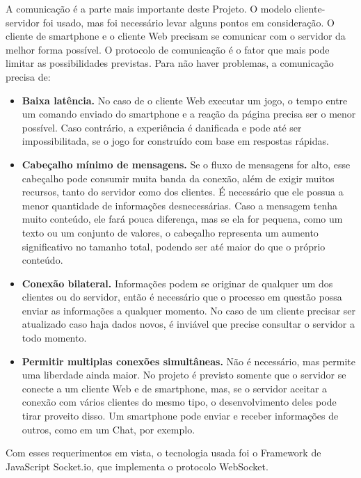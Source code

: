 \documentclass[a4paper,12pt]{article}
\begin{document}
A comunicação é a parte mais importante deste Projeto. O modelo cliente-servidor foi usado, mas foi necessário levar alguns pontos em consideração. O cliente de smartphone e o cliente Web precisam se comunicar com o servidor da melhor forma possível. O protocolo de comunicação é o fator que mais pode limitar as possibilidades previstas. Para não haver problemas, a comunicação precisa de:
\begin{itemize}

    \item \textbf{Baixa latência.} No caso de o cliente Web executar um jogo, o tempo entre um comando enviado do smartphone e a reação da página precisa ser o menor possível. Caso contrário, a experiência é danificada e pode até ser impossibilitada, se o jogo for construído com base em respostas rápidas.

    \item \textbf{Cabeçalho mínimo de mensagens.} Se o fluxo de mensagens for alto, esse cabeçalho pode consumir muita banda da conexão, além de exigir muitos recursos, tanto do servidor como dos clientes. É necessário que ele possua a menor quantidade de informações desnecessárias. Caso a mensagem tenha muito conteúdo, ele fará pouca diferença, mas se ela for pequena, como um texto ou um conjunto de valores, o cabeçalho representa um aumento significativo no tamanho total, podendo ser até maior do que o próprio conteúdo.

    \item \textbf{Conexão bilateral.} Informações podem se originar de qualquer um dos clientes ou do servidor, então é necessário que o processo em questão possa enviar as informações a qualquer momento. No caso de um cliente precisar ser atualizado caso haja dados novos, é inviável que precise consultar o servidor a todo momento.

    \item \textbf{Permitir multiplas conexões simultâneas.} Não é necessário, mas permite uma liberdade ainda maior. No projeto é previsto somente que o servidor se conecte a um cliente Web e de smartphone, mas, se o servidor aceitar a conexão com vários clientes do mesmo tipo, o desenvolvimento deles pode tirar proveito disso. Um smartphone pode enviar e receber informações de outros, como em um Chat, por exemplo.
\end{itemize}

Com esses requerimentos em vista, o tecnologia usada foi o Framework de JavaScript Socket.io, que implementa o protocolo WebSocket.
\end{document}
